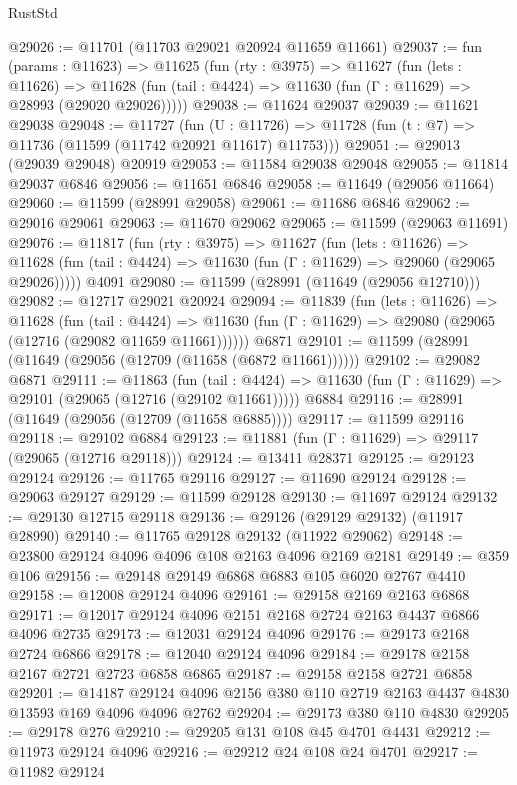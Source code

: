 \begin{lexlean}{RustStd}
\begin{coremodule}
@29026 := @11701 (@11703 @29021 @20924 @11659 @11661)
@29037 := fun (params : @11623) =>
  @11625
    (fun (rty : @3975) =>
    @11627
      (fun (lets : @11626) =>
      @11628 (fun (tail : @4424) => @11630 (fun (Γ : @11629) => @28993 (@29020 @29026)))))
@29038 := @11624 @29037
@29039 := @11621 @29038
@29048 := @11727
    (fun (U : @11726) => @11728 (fun (t : @7) => @11736 (@11599 (@11742 @20921 @11617) @11753)))
@29051 := @29013 (@29039 @29048) @20919
@29053 := @11584 @29038 @29048
@29055 := @11814 @29037 @6846
@29056 := @11651 @6846
@29058 := @11649 (@29056 @11664)
@29060 := @11599 (@28991 @29058)
@29061 := @11686 @6846
@29062 := @29016 @29061
@29063 := @11670 @29062
@29065 := @11599 (@29063 @11691)
@29076 := @11817
    (fun (rty : @3975) =>
    @11627
      (fun (lets : @11626) =>
      @11628 (fun (tail : @4424) => @11630 (fun (Γ : @11629) => @29060 (@29065 @29026)))))
    @4091
@29080 := @11599 (@28991 (@11649 (@29056 @12710)))
@29082 := @12717 @29021 @20924
@29094 := @11839
    (fun (lets : @11626) =>
    @11628
      (fun (tail : @4424) =>
      @11630 (fun (Γ : @11629) => @29080 (@29065 (@12716 (@29082 @11659 @11661))))))
    @6871
@29101 := @11599 (@28991 (@11649 (@29056 (@12709 (@11658 (@6872 @11661))))))
@29102 := @29082 @6871
@29111 := @11863
    (fun (tail : @4424) => @11630 (fun (Γ : @11629) => @29101 (@29065 (@12716 (@29102 @11661)))))
    @6884
@29116 := @28991 (@11649 (@29056 (@12709 (@11658 @6885))))
@29117 := @11599 @29116
@29118 := @29102 @6884
@29123 := @11881 (fun (Γ : @11629) => @29117 (@29065 (@12716 @29118)))
@29124 := @13411 @28371
@29125 := @29123 @29124
@29126 := @11765 @29116
@29127 := @11690 @29124
@29128 := @29063 @29127
@29129 := @11599 @29128
@29130 := @11697 @29124
@29132 := @29130 @12715 @29118
@29136 := @29126 (@29129 @29132) (@11917 @28990)
@29140 := @11765 @29128 @29132 (@11922 @29062)
@29148 := @23800 @29124 @4096 @4096 @108 @2163 @4096 @2169 @2181
@29149 := @359 @106
@29156 := @29148 @29149 @6868 @6883 @105 @6020 @2767 @4410
@29158 := @12008 @29124 @4096
@29161 := @29158 @2169 @2163 @6868
@29171 := @12017 @29124 @4096 @2151 @2168 @2724 @2163 @4437 @6866 @4096 @2735
@29173 := @12031 @29124 @4096
@29176 := @29173 @2168 @2724 @6866
@29178 := @12040 @29124 @4096
@29184 := @29178 @2158 @2167 @2721 @2723 @6858 @6865
@29187 := @29158 @2158 @2721 @6858
@29201 := @14187 @29124 @4096 @2156 @380 @110 @2719 @2163 @4437 @4830 @13593 @169 @4096 @4096 @2762
@29204 := @29173 @380 @110 @4830
@29205 := @29178 @276
@29210 := @29205 @131 @108 @45 @4701 @4431
@29212 := @11973 @29124 @4096
@29216 := @29212 @24 @108 @24 @4701
@29217 := @11982 @29124

\end{coremodule}
\end{lexlean}

